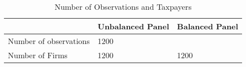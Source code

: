 \begin{table}[htbp]
\caption{\label{clabel} Number of Observations and Taxpayers}\centering\medskip
\begin{tabular}{lll} \hline \hline
 & Unbalanced Panel  & Balanced Panel  \\  \hline 
Number of observations & 1200 \\  
Number of Firms & 1200 & 1200 \\  
\hline \hline \end{tabular}
\end{table}
